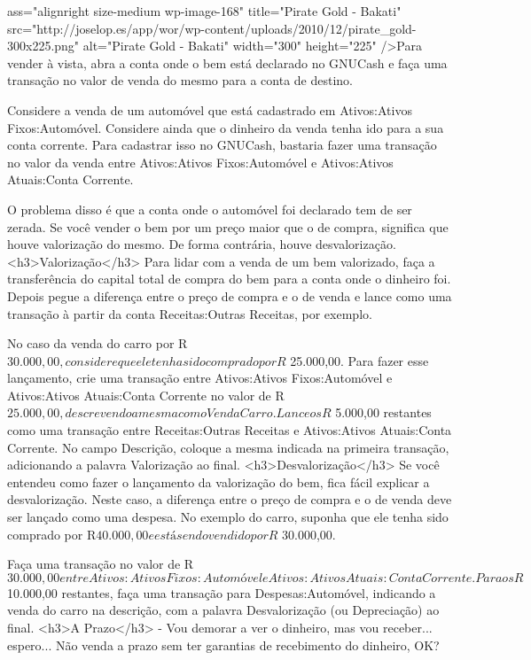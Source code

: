 ass="alignright size-medium wp-image-168" title="Pirate Gold - Bakati" src="http://joselop.es/app/wor/wp-content/uploads/2010/12/pirate_gold-300x225.png" alt="Pirate Gold - Bakati" width="300" height="225" />Para vender à vista, abra a conta onde o bem está declarado no GNUCash e faça uma transação no valor de venda do mesmo para a conta de destino.

Considere a venda de um automóvel que está cadastrado em Ativos:Ativos Fixos:Automóvel. Considere ainda que o dinheiro da venda tenha ido para a sua conta corrente. Para cadastrar isso no GNUCash, bastaria fazer uma transação no valor da venda entre Ativos:Ativos Fixos:Automóvel e Ativos:Ativos Atuais:Conta Corrente.

O problema disso é que a conta onde o automóvel foi declarado tem de ser zerada. Se você vender o bem por um preço maior que o de compra, significa que houve valorização do mesmo. De forma contrária, houve desvalorização.
<h3>Valorização</h3>
Para lidar com a venda de um bem valorizado, faça a transferência do capital total de compra do bem para a conta onde o dinheiro foi. Depois pegue a diferença entre o preço de compra e o de venda e lance como uma transação à partir da conta Receitas:Outras Receitas, por exemplo.

No caso da venda do carro por R$ 30.000,00, considere que ele tenha sido comprado por R$ 25.000,00. Para fazer esse lançamento, crie uma transação entre Ativos:Ativos Fixos:Automóvel e Ativos:Ativos Atuais:Conta Corrente no valor de R$ 25.000,00, descrevendo a mesma como Venda Carro. Lance os R$ 5.000,00 restantes como uma transação entre Receitas:Outras Receitas e Ativos:Ativos Atuais:Conta Corrente. No campo Descrição, coloque a mesma indicada na primeira transação, adicionando a palavra Valorização ao final.
<h3>Desvalorização</h3>
Se você entendeu como fazer o lançamento da valorização do bem, fica fácil explicar a desvalorização. Neste caso, a diferença entre o preço de compra e o de venda deve ser lançado como uma despesa. No exemplo do carro, suponha que ele tenha sido comprado por R$ 40.000,00 e está sendo vendido por R$ 30.000,00.

Faça uma transação no valor de R$ 30.000,00 entre Ativos:Ativos Fixos:Automóvel e Ativos:Ativos Atuais:Conta Corrente. Para os R$ 10.000,00 restantes, faça uma transação para Despesas:Automóvel, indicando a venda do carro na descrição, com a palavra Desvalorização (ou Depreciação) ao final.
<h3>A Prazo</h3>
- Vou demorar a ver o dinheiro, mas vou receber... espero...
Não venda a prazo sem ter garantias de recebimento do dinheiro, OK?

